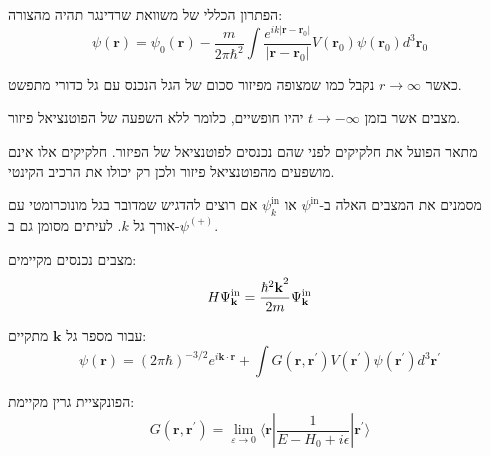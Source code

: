 \documentclass{tstextbook}
\begin{document}
\begin{corollary}
הפתרון הכללי של משוואת שרדינגר תהיה מהצורה:
$$\psi\left(\mathbf{r}\right)=\psi_{0}(\mathbf{r})-{\frac{m}{2\pi\hbar^{2}}}\int{\frac{e^{i k\left|\mathbf{r}-\mathbf{r}_{0}\right|}}{\left|\mathbf{r}-\mathbf{r}_{0}\right|}}V\left(\mathbf{r}_{0}\right)\psi\left(\mathbf{r}_{0}\right)d^{3}\mathbf{r}_{0}$$

\end{corollary}
\begin{remark}
כאשר \(r\to \infty\) נקבל כמו שמצופה מפיזור סכום של הגל הנכנס עם גל כדורי מתפשט.

\end{remark}
\begin{definition}
מצבים אשר בזמן \(t\to -\infty\) יהיו חופשיים, כלומר ללא השפעה של הפוטנציאל פיזור.

\end{definition}
\begin{remark}
מתאר הפועל את חלקיקים לפני שהם נכנסים לפוטנציאל של הפיזור. חלקיקים אלו אינם מושפעים מהפוטנציאל פיזור ולכן רק יכולו את הרכיב הקינטי.

\end{remark}
\begin{symbolize}
מסמנים את המצבים האלה ב-\(\psi^{\text{in}}\) או \(\psi^{\text{in}}_{k}\) אם רוצים להדגיש שמדובר בגל מונוכרומטי עם אורך גל \(k\). לעיתים מסומן גם ב-\(\psi^{(+)}\).

\end{symbolize}
\begin{corollary}
מצבים נכנסים מקיימים:
$$H\Psi_{\bf k}^{\mathrm{in}}=\frac{{\hbar^{2}\bf k}^{2}}{2m}\Psi_{\bf k}^{\mathrm{in}}$$

\end{corollary}
\begin{corollary}
עבור מספר גל \(\mathbf{k}\) מתקיים:
$$\psi(\mathbf{r})=(2\pi\hbar)^{-3/2}e^{i\mathbf{k}\cdot\mathbf{r}}+\int G(\mathbf{r},\mathbf{r}^{\prime})V(\mathbf{r}^{\prime})\psi(\mathbf{r}^{\prime})d^{3}\mathbf{r}^{\prime}$$

\end{corollary}
\begin{proposition}
הפונקציית גרין מקיימת:
$$G(\mathbf{r},\mathbf{r^{\prime}})=\lim_{ \varepsilon \to 0 } \langle\mathbf{r}|{\frac{1}{E-H_{0}+i\epsilon}}|\mathbf{r^{\prime}}\rangle$$

\end{proposition}
\end{document}
